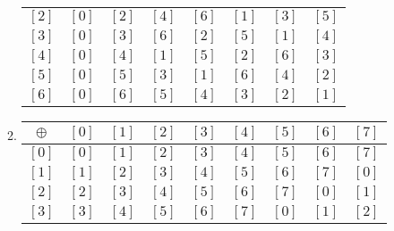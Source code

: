 \begin{enumerate}
\begin{enumerate}
\begin{tabular}{ c | c  c  c  c  c  c  c}
$\left[ 2 \right]$ & $\left[ 0 \right]$ & $\left[ 2 \right]$ & $\left[ 4 \right]$ & 
$\left[ 6 \right]$ & $\left[ 1 \right]$ & $\left[ 3 \right]$ & $\left[ 5 \right]$  \\ 

$\left[ 3 \right]$ & $\left[ 0 \right]$ & $\left[ 3 \right]$ & $\left[ 6 \right]$ & 
$\left[ 2 \right]$ & $\left[ 5 \right]$ & $\left[ 1 \right]$ & $\left[ 4 \right]$  \\ 

$\left[ 4 \right]$ & $\left[ 0 \right]$ & $\left[ 4 \right]$ & $\left[ 1 \right]$ & 
$\left[ 5 \right]$ & $\left[ 2 \right]$ & $\left[ 6 \right]$ & $\left[ 3 \right]$  \\ 

$\left[ 5 \right]$ & $\left[ 0 \right]$ & $\left[ 5 \right]$ & $\left[ 3 \right]$ & 
$\left[ 1 \right]$ & $\left[ 6 \right]$ & $\left[ 4 \right]$ & $\left[ 2 \right]$  \\ 

$\left[ 6 \right]$ & $\left[ 0 \right]$ & $\left[ 6 \right]$ & $\left[ 5 \right]$ & 
$\left[ 4 \right]$ & $\left[ 3 \right]$ & $\left[ 2 \right]$ & $\left[ 1 \right]$  \\ 
\end{tabular}

\item
\begin{tabular}{ c | c  c  c  c  c  c  c c}
$\oplus$ & $\left[ 0 \right]$ & $\left[ 1 \right]$ & $\left[ 2 \right]$ & $\left[ 3 \right]$ & 
$\left[ 4 \right]$ & $\left[ 5 \right]$ & $\left[ 6 \right]$ & $\left[ 7 \right]$  \\ \hline

$\left[ 0 \right]$ & $\left[ 0 \right]$ & $\left[ 1 \right]$ & $\left[ 2 \right]$ & 
$\left[ 3 \right]$ & $\left[ 4 \right]$ & $\left[ 5 \right]$ & $\left[ 6 \right]$ & 
$\left[ 7 \right]$  \\ 

$\left[ 1 \right]$ & $\left[ 1 \right]$ & $\left[ 2 \right]$ & $\left[ 3 \right]$ & 
$\left[ 4 \right]$ & $\left[ 5 \right]$ & $\left[ 6 \right]$ & $\left[ 7 \right]$ & 
$\left[ 0 \right]$ \\ 

$\left[ 2 \right]$ & $\left[ 2 \right]$ & $\left[ 3 \right]$ & $\left[ 4 \right]$ & 
$\left[ 5 \right]$ & $\left[ 6 \right]$ & $\left[ 7 \right]$ & $\left[ 0 \right]$ & 
$\left[ 1 \right]$  \\ 

$\left[ 3 \right]$ & $\left[ 3 \right]$ & $\left[ 4 \right]$ & $\left[ 5 \right]$ & 
$\left[ 6 \right]$ & $\left[ 7 \right]$ & $\left[ 0 \right]$ & $\left[ 1 \right]$ & 
$\left[ 2 \right]$  \\ 


\end{tabular}
\end{enumerate}
\end{enumerate}
